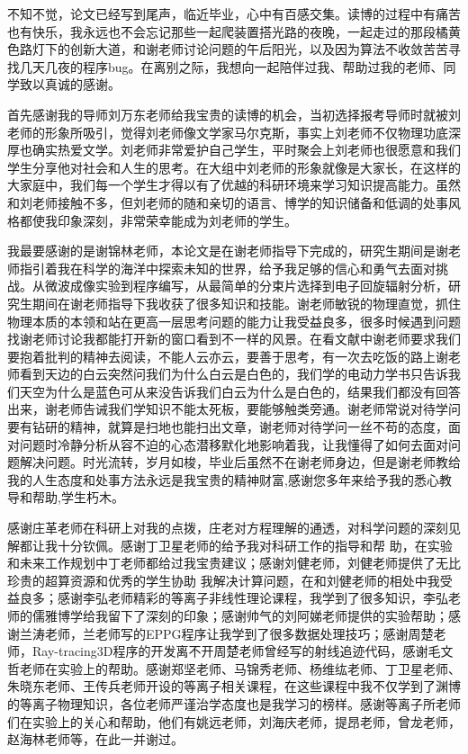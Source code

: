 \begin{acknowledgements}
不知不觉，论文已经写到尾声，临近毕业，心中有百感交集。读博的过程中有痛苦也有快乐，我永远也不会忘记那些一起爬装置搭光路的夜晚，一起走过的那段橘黄色路灯下的创新大道，和谢老师讨论问题的午后阳光，以及因为算法不收敛苦苦寻找几天几夜的程序bug。在离别之际，我想向一起陪伴过我、帮助过我的老师、同学致以真诚的感谢。

首先感谢我的导师刘万东老师给我宝贵的读博的机会，当初选择报考导师时就被刘老师的形象所吸引，觉得刘老师像文学家马尔克斯，事实上刘老师不仅物理功底深厚也确实热爱文学。刘老师非常爱护自己学生，平时聚会上刘老师也很愿意和我们学生分享他对社会和人生的思考。在大组中刘老师的形象就像是大家长，在这样的大家庭中，我们每一个学生才得以有了优越的科研环境来学习知识提高能力。虽然和刘老师接触不多，但刘老师的随和亲切的语言、博学的知识储备和低调的处事风格都使我印象深刻，非常荣幸能成为刘老师的学生。

我最要感谢的是谢锦林老师，本论文是在谢老师指导下完成的，研究生期间是谢老师指引着我在科学的海洋中探索未知的世界，给予我足够的信心和勇气去面对挑战。从微波成像实验到程序编写，从最简单的分束片选择到电子回旋辐射分析，研究生期间在谢老师指导下我收获了很多知识和技能。谢老师敏锐的物理直觉，抓住物理本质的本领和站在更高一层思考问题的能力让我受益良多，很多时候遇到问题找谢老师讨论我都能打开新的窗口看到不一样的风景。在看文献中谢老师要求我们要抱着批判的精神去阅读，不能人云亦云，要善于思考，有一次去吃饭的路上谢老师看到天边的白云突然问我们为什么白云是白色的，我们学的电动力学书只告诉我们天空为什么是蓝色可从来没告诉我们白云为什么是白色的，结果我们都没有回答出来，谢老师告诫我们学知识不能太死板，要能够触类旁通。谢老师常说对待学问要有钻研的精神，就算是扫地也能扫出文章，谢老师对待学问一丝不苟的态度，面对问题时冷静分析从容不迫的心态潜移默化地影响着我，让我懂得了如何去面对问题解决问题。时光流转，岁月如梭，毕业后虽然不在谢老师身边，但是谢老师教给我的人生态度和处事方法永远是我宝贵的精神财富,感谢您多年来给予我的悉心教导和帮助,学生朽木。
 
感谢庄革老师在科研上对我的点拨，庄老对方程理解的通透，对科学问题的深刻见解都让我十分钦佩。感谢丁卫星老师的给予我对科研工作的指导和帮
助，在实验和未来工作规划中丁老师都给过我宝贵建议；感谢刘健老师，刘健老师提供了无比珍贵的超算资源和优秀的学生协助
我解决计算问题，在和刘健老师的相处中我受益良多；感谢李弘老师精彩的等离子非线性理论课程，我学到了很多知识，李弘老师的儒雅博学给我留下了深刻的印象；感谢帅气的刘阿娣老师提供的实验帮助；感谢兰涛老师，兰老师写的EPPG程序让我学到了很多数据处理技巧；感谢周楚老师，Ray-tracing3D程序的开发离不开周楚老师曾经写的射线追迹代码，感谢毛文哲老师在实验上的帮助。感谢郑坚老师、马锦秀老师、杨维纮老师、丁卫星老师、朱晓东老师、王传兵老师开设的等离子相关课程，在这些课程中我不仅学到了渊博的等离子物理知识，各位老师严谨治学态度也是我学习的榜样。感谢等离子所老师们在实验上的关心和帮助，他们有姚远老师，刘海庆老师，提昂老师，曾龙老师，赵海林老师等，在此一并谢过。


\end{acknowledgements}
